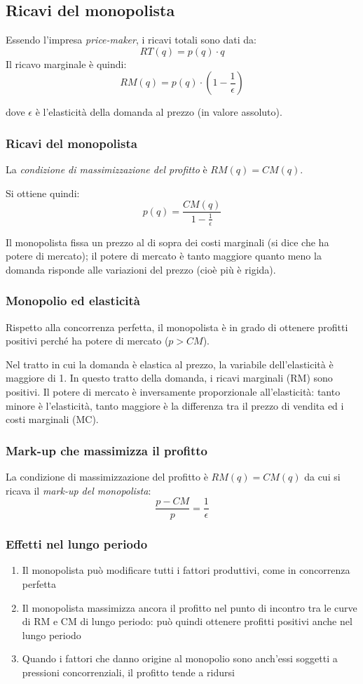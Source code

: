\subsection{Ricavi del monopolista}

Essendo l’impresa \emph{price-maker}, i ricavi totali sono dati da:
\[
RT(q) = p(q) \cdot q
\]
Il ricavo marginale è quindi:
\[
RM(q) = p(q) \cdot \left( 1 - \frac{1}{\epsilon} \right)
\]

dove $\epsilon$ è l'elasticità della domanda al prezzo (in valore assoluto).

\subsubsection{Ricavi del monopolista}
La \emph{condizione di massimizzazione del profitto} è $RM(q) = CM(q)$.

Si ottiene quindi:
\[
p(q) = \frac{CM(q)}{1 - \frac{1}{\epsilon}}
\]

Il monopolista fissa un prezzo al di sopra dei costi marginali (si dice che ha potere di mercato); il potere di mercato è tanto maggiore quanto meno la domanda risponde alle variazioni del prezzo
(cioè più è rigida).

\subsubsection{Monopolio ed elasticità}
Rispetto alla concorrenza perfetta, il monopolista è in grado di ottenere profitti positivi perché ha potere
di mercato ($p>CM$).

Nel tratto in cui la domanda è elastica al prezzo, la variabile dell'elasticità è maggiore di 1. In questo
tratto della domanda, i ricavi marginali (RM) sono positivi. Il potere di mercato è inversamente
proporzionale all'elasticità: tanto minore è l’elasticità, tanto maggiore è la differenza tra il prezzo di
vendita ed i costi marginali (MC).

\subsubsection{Mark-up che massimizza il profitto}
La condizione di massimizzazione del profitto è $RM(q) = CM(q)$ da cui si ricava il \emph{mark-up del monopolista}:
\[
\frac{p - CM}{p} = \frac{1}{\epsilon}
\]

\subsubsection{Effetti nel lungo periodo}
\begin{enumerate}
	\item Il monopolista può modificare tutti i fattori produttivi, come in concorrenza perfetta
	\item Il monopolista massimizza ancora il profitto nel punto di incontro tra le curve di RM e CM di lungo
	periodo:
può quindi ottenere profitti positivi anche nel lungo periodo
	\item Quando i fattori che danno origine al monopolio sono anch’essi soggetti a pressioni concorrenziali, il
	profitto tende a ridursi
\end{enumerate}

